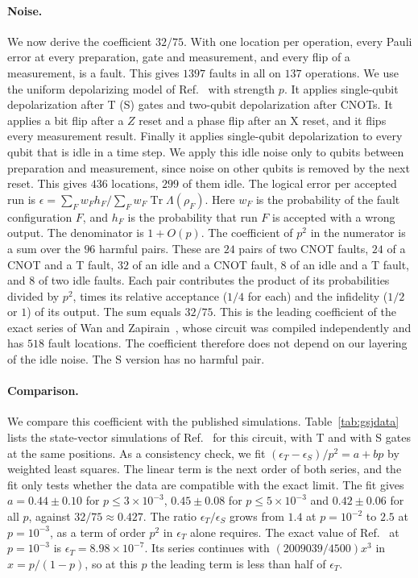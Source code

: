 \documentclass[aps,prl,reprint,twocolumn,amsmath,amssymb,floatfix,nofootinbib,superscriptaddress]{revtex4-2}
\theoremstyle{definition}
\theoremstyle{remark}
\newcommand{\tr}{\operatorname{Tr}}
\begin{document}
\paragraph*{Noise.}
We now derive the coefficient $32/75$. With one location per operation, every Pauli error at every preparation, gate and measurement, and every flip of a measurement, is a fault. This gives $1397$ faults in all on $137$ operations. We use the uniform depolarizing model of Ref.~\cite{gsjcode} with strength $p$. It applies single-qubit depolarization after T (S) gates and two-qubit depolarization after CNOTs. It applies a bit flip after a $Z$ reset and a phase flip after an X reset, and it flips every measurement result. Finally it applies single-qubit depolarization to every qubit that is idle in a time step. We apply this idle noise only to qubits between preparation and measurement, since noise on other qubits is removed by the next reset. This gives $436$ locations, $299$ of them idle. The logical error per accepted run is $\epsilon=\sum_Fw_Fh_F/\sum_Fw_F\tr\Lambda(\rho_F)$. Here $w_F$ is the probability of the fault configuration $F$, and $h_F$ is the probability that run $F$ is accepted with a wrong output. The denominator is $1+O(p)$. The coefficient of $p^2$ in the numerator is a sum over the $96$ harmful pairs. These are $24$ pairs of two CNOT faults, $24$ of a CNOT and a T fault, $32$ of an idle and a CNOT fault, $8$ of an idle and a T fault, and $8$ of two idle faults. Each pair contributes the product of its probabilities divided by $p^2$, times its relative acceptance ($1/4$ for each) and the infidelity ($1/2$ or $1$) of its output. The sum equals $32/75$. This is the leading coefficient of the exact series of Wan and Zapirain~\cite{wanzapirain}, whose circuit was compiled independently and has $518$ fault locations. The coefficient therefore does not depend on our layering of the idle noise. The S version has no harmful pair.

\paragraph*{Comparison.}
We compare this coefficient with the published simulations. Table~\ref{tab:gsjdata} lists the state-vector simulations of Ref.~\cite{gsjcode} for this circuit, with T and with S gates at the same positions. As a consistency check, we fit $(\epsilon_T-\epsilon_S)/p^2=a+bp$ by weighted least squares. The linear term is the next order of both series, and the fit only tests whether the data are compatible with the exact limit. The fit gives $a=0.44\pm0.10$ for $p\leq3\times10^{-3}$, $0.45\pm0.08$ for $p\leq5\times10^{-3}$ and $0.42\pm0.06$ for all $p$, against $32/75\approx0.427$. The ratio $\epsilon_T/\epsilon_S$ grows from $1.4$ at $p=10^{-2}$ to $2.5$ at $p=10^{-3}$, as a term of order $p^2$ in $\epsilon_T$ alone requires. The exact value of Ref.~\cite{wanzapirain} at $p=10^{-3}$ is $\epsilon_T=8.98\times10^{-7}$. Its series continues with $(2009039/4500)x^3$ in $x=p/(1-p)$, so at this $p$ the leading term is less than half of $\epsilon_T$.
\end{document}
